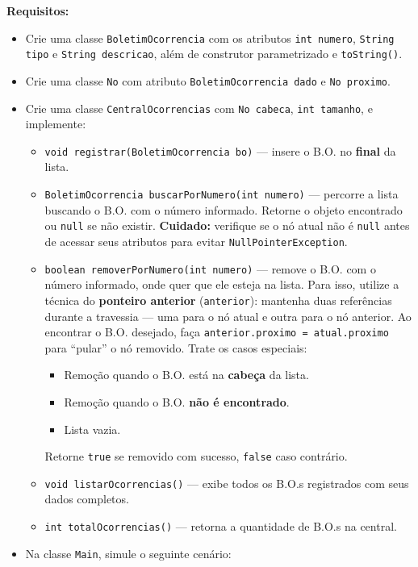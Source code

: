 \documentclass[12pt, a4paper]{article}
\begin{document}
\textbf{Requisitos:}
\begin{itemize}
    \item Crie uma classe \texttt{BoletimOcorrencia} com os atributos \texttt{int numero}, \texttt{String tipo} e \texttt{String descricao}, além de construtor parametrizado e \texttt{toString()}.
    \item Crie uma classe \texttt{No} com atributo \texttt{BoletimOcorrencia dado} e \texttt{No proximo}.
    \item Crie uma classe \texttt{CentralOcorrencias} com \texttt{No cabeca}, \texttt{int tamanho}, e implemente:
    \begin{itemize}
        \item \texttt{void registrar(BoletimOcorrencia bo)} — insere o B.O. no \textbf{final} da lista.
        \item \texttt{BoletimOcorrencia buscarPorNumero(int numero)} — percorre a lista buscando o B.O. com o número informado. Retorne o objeto encontrado ou \texttt{null} se não existir. \textbf{Cuidado:} verifique se o nó atual não é \texttt{null} antes de acessar seus atributos para evitar \texttt{NullPointerException}.
        \item \texttt{boolean removerPorNumero(int numero)} — remove o B.O. com o número informado, onde quer que ele esteja na lista. Para isso, utilize a técnica do \textbf{ponteiro anterior} (\texttt{anterior}): mantenha duas referências durante a travessia — uma para o nó atual e outra para o nó anterior. Ao encontrar o B.O. desejado, faça \texttt{anterior.proximo = atual.proximo} para ``pular'' o nó removido. Trate os casos especiais:
        \begin{itemize}
            \item Remoção quando o B.O. está na \textbf{cabeça} da lista.
            \item Remoção quando o B.O. \textbf{não é encontrado}.
            \item Lista vazia.
        \end{itemize}
        Retorne \texttt{true} se removido com sucesso, \texttt{false} caso contrário.
        \item \texttt{void listarOcorrencias()} — exibe todos os B.O.s registrados com seus dados completos.
        \item \texttt{int totalOcorrencias()} — retorna a quantidade de B.O.s na central.
    \end{itemize}
    \item Na classe \texttt{Main}, simule o seguinte cenário:

\end{itemize}
\end{document}
